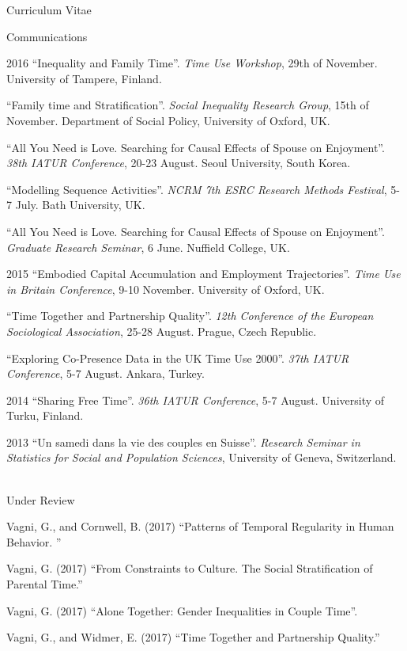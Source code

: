\documentclass[12pt,a4paper]{article}
\begin{document}
\begin{cv}{Curriculum Vitae}
\begin{cvlist}{Communications}
	 \item[2016]  ``Inequality and Family Time''. \emph{Time Use Workshop}, 29th of November. University of Tampere, Finland. 
	 
	 \item[]  ``Family time and Stratification''. \emph{Social Inequality Research Group}, 15th of November. Department of Social Policy, University of Oxford, UK.  
	 
	 \item[]  ``All You Need is Love. Searching for Causal Effects of Spouse on Enjoyment''. \emph{38th IATUR Conference}, 20-23 August. Seoul University, South Korea. 
	 
	 \item[]  ``Modelling Sequence Activities''. \emph{NCRM 7th ESRC Research Methods Festival}, 5-7 July. Bath University, UK. 
	 
	  \item[]  ``All You Need is Love. Searching for Causal Effects of Spouse on Enjoyment''. \emph{Graduate Research Seminar}, 6 June. Nuffield College, UK. 
	  
	   \item[2015]  ``Embodied Capital Accumulation and Employment Trajectories''. \emph{Time Use in Britain Conference}, 9-10 November. University of Oxford, UK.  
	   
	   	 \item[]  ``Time Together and Partnership Quality''. \emph{12th Conference of the European Sociological Association}, 25-28 August. Prague, Czech Republic.  
	   
	      \item[]  ``Exploring Co-Presence Data in the UK Time Use 2000''. \emph{37th IATUR Conference}, 5-7 August. Ankara, Turkey.  
	      
	       \item[2014]  ``Sharing Free Time''. \emph{36th IATUR Conference}, 5-7 August. University of Turku, Finland.  
	        
	        \item[2013] ``Un samedi dans la vie des couples en Suisse''. \emph{Research Seminar in Statistics for Social and Population Sciences}, University of Geneva, Switzerland. 
	        \end{cvlist}

 \begin{cvlist}{Under Review}
 	
 	 \item Vagni, G., and Cornwell, B. (2017)  ``Patterns of Temporal Regularity in Human Behavior. '' 
 	   	\item Vagni, G. (2017)  ``From Constraints to Culture. The Social Stratification of Parental Time.'' 
 	   	\item Vagni, G. (2017) ``Alone Together: Gender Inequalities in Couple Time''. 
 	   	\item Vagni, G., and Widmer, E. (2017)  ``Time Together and Partnership Quality.'' 
 	   	

\end{cvlist}
\end{cv}
\end{document}
